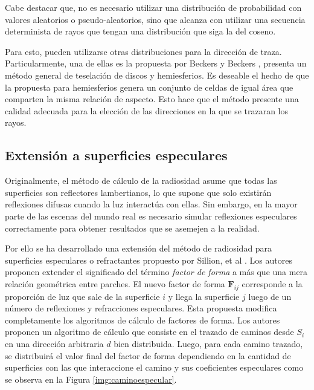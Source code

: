 Cabe destacar que, no es necesario utilizar una distribución de probabilidad con valores aleatorios o pseudo-aleatorios, sino que alcanza con utilizar una secuencia determinista de rayos que tengan una distribución que siga la del coseno.

Para esto, pueden utilizarse otras distribuciones para la dirección de traza. Particularmente, una de ellas es la propuesta por Beckers y Beckers \cite{Beckers}, presenta un método general de teselación de discos y hemiesferios. Es deseable el hecho de que la propuesta para hemiesferios genera un conjunto de celdas de igual área que comparten la misma relación de aspecto. Esto hace que el método presente una calidad adecuada para la elección de las direcciones en la que se trazaran los rayos.

\subsection{Extensión a superficies especulares}

Originalmente, el método de cálculo de la radiosidad asume que todas las superficies son reflectores lambertianos, lo que supone que solo existirán reflexiones difusas cuando la luz interactúa con ellas. Sin embargo, en la mayor parte de las escenas del mundo real es necesario simular reflexiones especulares correctamente para obtener resultados que se asemejen a la realidad.

Por ello se ha desarrollado una extensión del método de radiosidad para superficies especulares o refractantes propuesto por Sillion, et al \cite{Sillion}. Los autores proponen extender el significado del término \textit{factor de forma} a más que una mera relación geométrica entre parches. El nuevo factor de forma $\mathbf{F}_{ij}$ corresponde a la proporción de luz que sale de la superficie $i$ y llega la superficie $j$ luego de un número de reflexiones y refracciones especulares. Esta propuesta modifica completamente los algoritmos de cálculo de factores de forma. Los autores proponen un algoritmo de cálculo que consiste en el trazado de caminos desde $S_{i}$ en una dirección arbitraria $d$ bien distribuida.  Luego, para cada camino trazado, se distribuirá el valor final del factor de forma dependiendo en la cantidad de superficies con las que interaccione el camino y sus coeficientes especulares como se observa en la Figura \ref{img:caminoespecular}.

